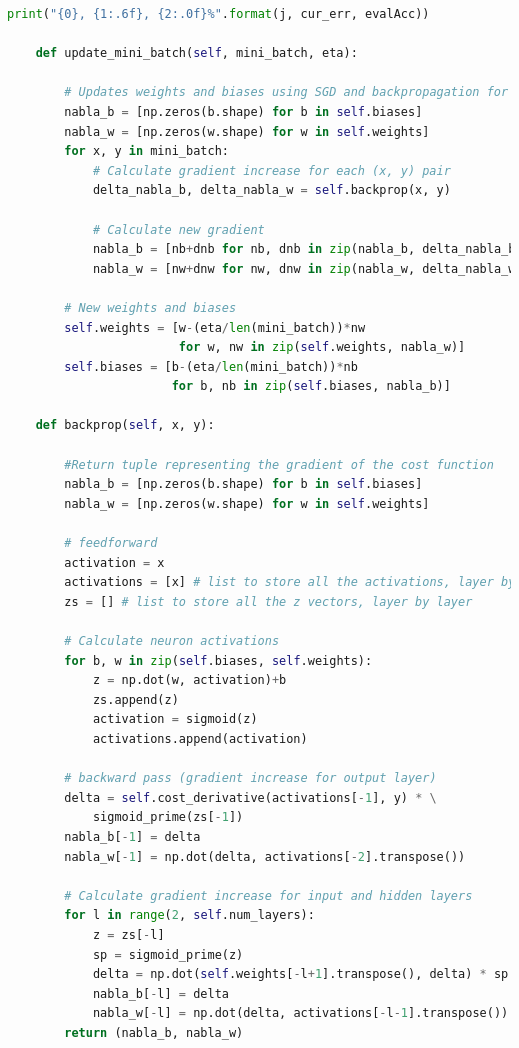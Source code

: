 \documentclass[12pt,twoside]{article}
\begin{document}
\begin{lstlisting}[caption={Plik zawierający sieć - network.py},label={Lst:network_py},language=Python,basicstyle=\scriptsize]
            print("{0}, {1:.6f}, {2:.0f}%".format(j, cur_err, evalAcc))

    def update_mini_batch(self, mini_batch, eta):

        # Updates weights and biases using SGD and backpropagation for each mini batch
        nabla_b = [np.zeros(b.shape) for b in self.biases]
        nabla_w = [np.zeros(w.shape) for w in self.weights]
        for x, y in mini_batch:
            # Calculate gradient increase for each (x, y) pair
            delta_nabla_b, delta_nabla_w = self.backprop(x, y)

            # Calculate new gradient
            nabla_b = [nb+dnb for nb, dnb in zip(nabla_b, delta_nabla_b)]
            nabla_w = [nw+dnw for nw, dnw in zip(nabla_w, delta_nabla_w)]

        # New weights and biases
        self.weights = [w-(eta/len(mini_batch))*nw
                        for w, nw in zip(self.weights, nabla_w)]
        self.biases = [b-(eta/len(mini_batch))*nb
                       for b, nb in zip(self.biases, nabla_b)]

    def backprop(self, x, y):

        #Return tuple representing the gradient of the cost function
        nabla_b = [np.zeros(b.shape) for b in self.biases]
        nabla_w = [np.zeros(w.shape) for w in self.weights]

        # feedforward
        activation = x
        activations = [x] # list to store all the activations, layer by layer
        zs = [] # list to store all the z vectors, layer by layer
        
        # Calculate neuron activations
        for b, w in zip(self.biases, self.weights):
            z = np.dot(w, activation)+b
            zs.append(z)
            activation = sigmoid(z)
            activations.append(activation)

        # backward pass (gradient increase for output layer)
        delta = self.cost_derivative(activations[-1], y) * \
            sigmoid_prime(zs[-1])
        nabla_b[-1] = delta
        nabla_w[-1] = np.dot(delta, activations[-2].transpose())

        # Calculate gradient increase for input and hidden layers
        for l in range(2, self.num_layers):
            z = zs[-l]
            sp = sigmoid_prime(z)
            delta = np.dot(self.weights[-l+1].transpose(), delta) * sp
            nabla_b[-l] = delta
            nabla_w[-l] = np.dot(delta, activations[-l-1].transpose())
        return (nabla_b, nabla_w)


\end{lstlisting}
\end{document}
